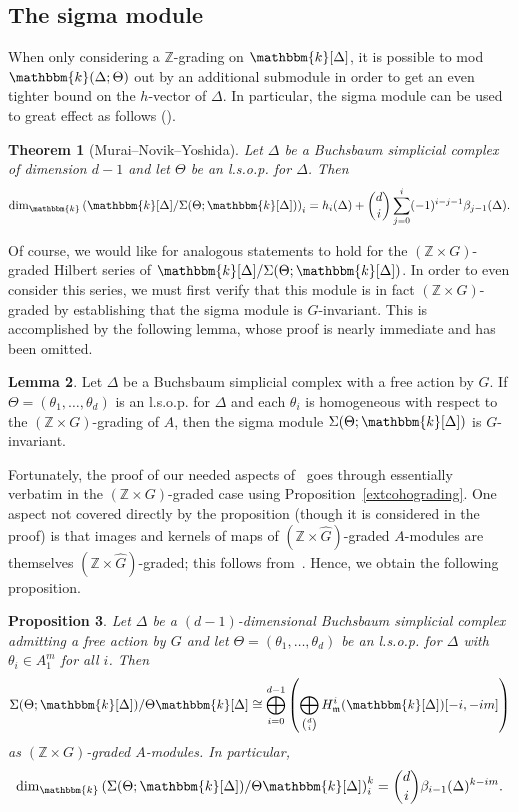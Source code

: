 \documentclass[10pt]{amsart}
\newtheorem{theo}{Theorem}[section]
\newtheorem{prop}[theo]{Proposition}
\theoremstyle{definition}
\newtheorem{lemma}[theo]{Lemma}
\newcommand{\field}{\mathbbm{k}}
\newcommand{\ZZ}{{\mathbb Z}}
\newcommand{\mideal}{\ensuremath{\mathfrak{m}}}
\begin{document}
\subsection{The sigma module}

When only considering a $\ZZ$-grading on $\field[\Delta]$, it is possible to mod $\field(\Delta; \Theta)$ out by an additional submodule in order to get an even tighter bound on the $h$-vector of $\Delta$. In particular, the sigma module can be used to great effect as follows (\cite[Theorem~1.2]{BBMD}).

\begin{theo}[Murai--Novik--Yoshida]\label{BBMD}
Let $\Delta$ be a Buchsbaum simplicial complex of dimension $d-1$ and let $\Theta$ be an l.s.o.p. for $\Delta$. Then
\[
\dim_\field \left(\field[\Delta]/\Sigma(\Theta; \field[\Delta])\right)_i = h_i(\Delta)+\binom{d}{i}\sum_{j=0}^i(-1)^{i-j-1}\beta_{j-1}(\Delta).
\]
\end{theo}

Of course, we would like for analogous statements to hold for the $(\ZZ\times G)$-graded Hilbert series of $\field[\Delta]/\Sigma(\Theta; \field[\Delta])$. In order to even consider this series, we must first verify that this module is in fact $(\ZZ\times G)$-graded by establishing that the sigma module is $G$-invariant. This is accomplished by the following lemma, whose proof is nearly immediate and has been omitted.

\begin{lemma}
Let $\Delta$ be a Buchsbaum simplicial complex with a free action by $G$. If $\Theta=(\theta_1, \ldots, \theta_d)$ is an l.s.o.p. for $\Delta$ and each $\theta_i$ is homogeneous with respect to the $(\ZZ\times G)$-grading of $A$, then the sigma module $\Sigma (\Theta; \field[\Delta])$ is $G$-invariant.
\end{lemma}

Fortunately, the proof of our needed aspects of~\cite[Theorem~2.3]{BBMD} goes through essentially verbatim in the $(\ZZ\times G)$-graded case using Proposition~\ref{extcohograding}. One aspect not covered directly by the proposition (though it is considered in the proof) is that images and kernels of maps of $(\ZZ\times\hat{G})$-graded $A$-modules are themselves $(\ZZ\times\hat{G})$-graded; this follows from~\cite[Proposition~II.11.3.3]{Bourbaki}. Hence, we obtain the following proposition.

\begin{prop}\label{sigmaModuleProp}
Let $\Delta$ be a $(d-1)$-dimensional Buchsbaum simplicial complex admitting a free action by $G$ and let $\Theta=(\theta_1, \ldots, \theta_d)$ be an l.s.o.p. for $\Delta$ with $\theta_i\in A_1^m$ for all $i$. Then
\[
\Sigma(\Theta;\field[\Delta])/\Theta\field[\Delta]\cong\bigoplus_{i=0}^{d-1}\left(\bigoplus_{\binom{d}{i}}H_\mideal^{i}(\field[\Delta])[-i, -im]\right)
\]
as $(\ZZ\times G)$-graded $A$-modules. In particular,
\[
\dim_{\field}\left(\Sigma(\Theta; \field[\Delta])/\Theta\field[\Delta]\right)_i^k=\binom{d}{i}\beta_{i-1}(\Delta)^{k-im}.
\]
\end{prop}
\end{document}
